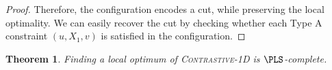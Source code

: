 \documentclass{article}
\theoremstyle{definition}  %
\theoremstyle{plain}
\newtheorem{theorem}{Theorem}
\numberwithin{observation}{section}
\numberwithin{claim}{section}
\numberwithin{fact}{section}
\numberwithin{lemma}{section}
\numberwithin{proposition}{section}
\numberwithin{theorem}{section}
\numberwithin{corollary}{section}
\numberwithin{definition}{section}
\DeclareMathOperator{\dist}{dist}
\theoremstyle{plain}
\begin{document}
\begin{proof}
Therefore, the configuration encodes a cut, while preserving the local optimality. We can easily recover the cut by checking whether each Type A constraint $(u, X_1, v)$ is satisfied in the configuration.
\end{proof}

\iffalse
\begin{theorem}\label{thm:contrastive-1d}
Finding a local optimum of \textsc{Contrastive-1D} is $\PLS$-complete.
\end{theorem}
\end{document}

